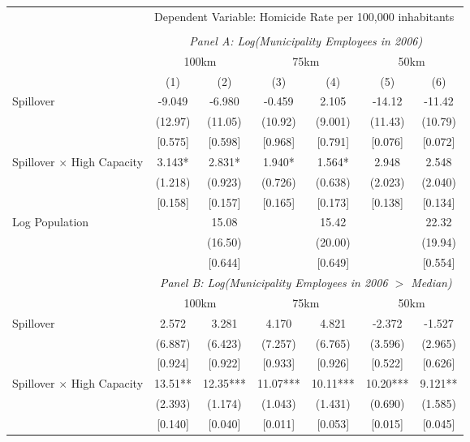 \documentclass[]{article}
\begin{document}
\begin{adjustbox}{max width=\textwidth}
\begin{tabular}{lcccccc}
\toprule
& \multicolumn{6}{l}{{Dependent Variable: Homicide Rate per 100,000 inhabitants}} \\
\cmidrule{2-7}\\

& \multicolumn{6}{c}{\textit{Panel A: Log(Municipality Employees in 2006)}} \\
\cmidrule{2-7}
& \multicolumn{2}{c}{100km} & \multicolumn{2}{c}{75km} & \multicolumn{2}{c}{50km} \\
\cmidrule(lr){2-3} \cmidrule(lr){4-5} \cmidrule(lr){6-7}
& (1) & (2) & (3) & (4) & (5) & (6) \\
\midrule

Spillover & -9.049 & -6.980 & -0.459 & 2.105 & -14.12 & -11.42 \\
& (12.97) & (11.05) & (10.92) & (9.001) & (11.43) & (10.79) \\
& [0.575] & [0.598] & [0.968] & [0.791] & [0.076] & [0.072] \\
[0.5em]

Spillover $\times$ High Capacity & 3.143* & 2.831* & 1.940* & 1.564* & 2.948 & 2.548 \\
& (1.218) & (0.923) & (0.726) & (0.638) & (2.023) & (2.040) \\
& [0.158] & [0.157] & [0.165] & [0.173] & [0.138] & [0.134] \\
[0.5em]

Log Population & & 15.08 & & 15.42 & & 22.32 \\
& & (16.50) & & (20.00) & & (19.94) \\
& & [0.644] & & [0.649] & & [0.554] \\

\midrule
& \multicolumn{6}{c}{\textit{Panel B: Log(Municipality Employees in 2006 $>$ Median)}} \\
\cmidrule{2-7}
& \multicolumn{2}{c}{100km} & \multicolumn{2}{c}{75km} & \multicolumn{2}{c}{50km} \\
\cmidrule(lr){2-3} \cmidrule(lr){4-5} \cmidrule(lr){6-7}

Spillover & 2.572 & 3.281 & 4.170 & 4.821 & -2.372 & -1.527 \\
& (6.887) & (6.423) & (7.257) & (6.765) & (3.596) & (2.965) \\
& [0.924] & [0.922] & [0.933] & [0.926] & [0.522] & [0.626] \\
[0.5em]

Spillover $\times$ High Capacity & 13.51** & 12.35*** & 11.07*** & 10.11*** & 10.20*** & 9.121** \\
& (2.393) & (1.174) & (1.043) & (1.431) & (0.690) & (1.585) \\
& [0.140] & [0.040] & [0.011] & [0.053] & [0.015] & [0.045] \\
[0.5em]


\end{tabular}
\end{adjustbox}
\end{document}

